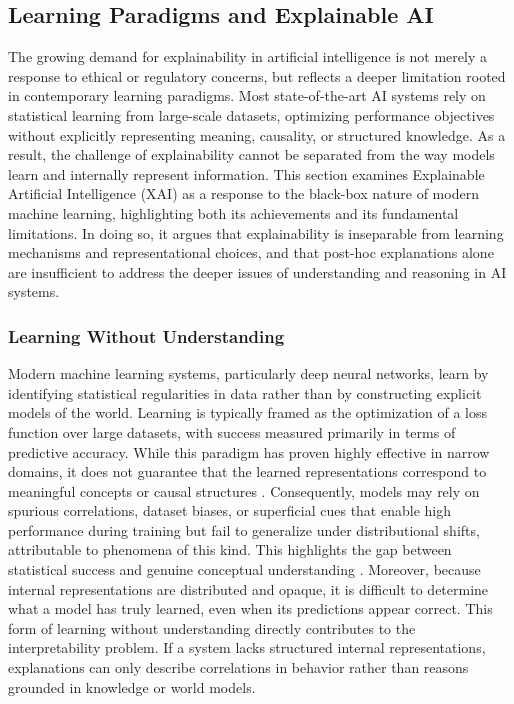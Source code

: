 \documentclass[12pt,a4paper]{report}
\begin{document}
\subsection{Learning Paradigms and Explainable AI}
The growing demand for explainability in artificial intelligence is not merely a response to ethical or regulatory concerns, but reflects a deeper limitation rooted in contemporary learning paradigms. Most state-of-the-art AI systems rely on statistical learning from large-scale datasets, optimizing performance objectives without explicitly representing meaning, causality, or structured knowledge. As a result, the challenge of explainability cannot be separated from the way models learn and internally represent information.
This section examines Explainable Artificial Intelligence (XAI) as a response to the black-box nature of modern machine learning, highlighting both its achievements and its fundamental limitations. In doing so, it argues that explainability is inseparable from learning mechanisms and representational choices, and that post-hoc explanations alone are insufficient to address the deeper issues of understanding and reasoning in AI systems.


\subsubsection{Learning Without Understanding}
Modern machine learning systems, particularly deep neural networks, learn by identifying statistical regularities in data rather than by constructing explicit models of the world. Learning is typically framed as the optimization of a loss function over large datasets, with success measured primarily in terms of predictive accuracy. While this paradigm has proven highly effective in narrow domains, it does not guarantee that the learned representations correspond to meaningful concepts or causal structures \cite{chiave15,chiave46}.
Consequently, models may rely on spurious correlations, dataset biases, or superficial cues that enable high performance during training but fail to generalize under distributional shifts, attributable to phenomena of this kind. This highlights the gap between statistical success and genuine conceptual understanding \cite{chiave17}. Moreover, because internal representations are distributed and opaque, it is difficult to determine what a model has truly learned, even when its predictions appear correct.
This form of learning without understanding directly contributes to the interpretability problem. If a system lacks structured internal representations, explanations can only describe correlations in behavior rather than reasons grounded in knowledge or world models.
\end{document}
